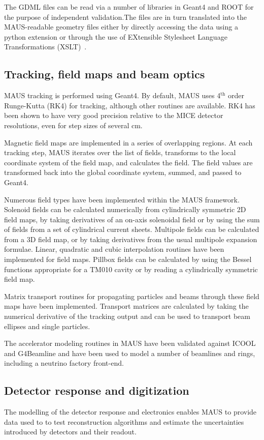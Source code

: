 \documentclass{JINST}
\begin{document}
The GDML files can be read via a
number of  libraries in Geant4 and ROOT for the
purpose of independent validation.The files are in turn translated into the MAUS-readable
geometry files either by directly accessing the data using a python
extension or through the use of EXtensible Stylesheet Language Transformations
(XSLT)~\cite{xslt}.

\subsection{Tracking, field maps and beam optics}\label{sec:fieldoptics}
MAUS tracking is performed using Geant4. By default, MAUS uses 4$^\mathrm{th}$ order Runge-Kutta (RK4) for tracking, although other routines are available. RK4 has been shown to have very good precision relative to the MICE detector resolutions, even for step sizes of several cm.

Magnetic field maps are implemented in a series of overlapping regions. At each tracking step, MAUS iterates over the list of fields, transforms to the local coordinate system of the field map, and calculates the field. The field values are transformed back into the global coordinate system, summed, and passed to Geant4. 

Numerous field types have been implemented within the MAUS framework. Solenoid fields can be calculated numerically from cylindrically symmetric 2D field maps, by taking derivatives of an on-axis solenoidal field or by using the sum of fields from a set of cylindrical current sheets. Multipole fields can be calculated from a 3D field map, or by taking derivatives from the usual multipole expansion formulae. Linear, quadratic and cubic interpolation routines have been implemented for field maps. Pillbox fields can be calculated by using the Bessel functions appropriate for a TM010 cavity or by reading a cylindrically symmetric field map.

Matrix transport routines for propagating particles and beams through these field maps have been implemented. Transport matrices are calculated by taking the numerical derivative of the tracking output and can be used to transport beam ellipses and single particles.

The accelerator modeling routines in MAUS have been validated against ICOOL and G4Beamline and have been used to model a number of beamlines and rings, including a neutrino factory front-end.

\subsection{Detector response and digitization}\label{sec:detresp}
The modelling of the detector response and electronics enables MAUS to provide  data used to to test reconstruction algorithms and estimate the uncertainties introduced by detectors and their readout.
\end{document}
